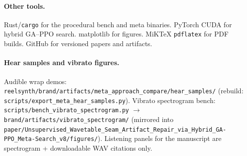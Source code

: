 \paragraph{Other tools.}
Rust/\texttt{cargo} for the procedural bench and meta binaries. PyTorch CUDA
for hybrid GA--PPO search. matplotlib for figures. MiKTeX \texttt{pdflatex}
for PDF builds. GitHub for versioned papers and artifacts.

\paragraph{Hear samples and vibrato figures.}
Audible wrap demos: \texttt{reelsynth/brand/artifacts/meta\_approach\_compare/hear\_samples/}
(rebuild: \texttt{scripts/export\_meta\_hear\_samples.py}).
Vibrato spectrogram bench: \texttt{scripts/bench\_vibrato\_spectrogram.py}
$\to$ \texttt{brand/artifacts/vibrato\_spectrogram/} (mirrored into \texttt{paper/Unsupervised_Wavetable_Seam_Artifact_Repair_via_Hybrid_GA-PPO_Meta-Search_v8/figures/}).
Listening panels for the manuscript are spectrogram + downloadable WAV citations only.
